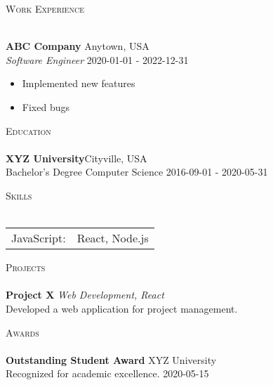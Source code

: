 \documentclass[a4paper]{article}
\newcommand{\lineunder} {
    \vspace*{-8pt} \\
    \hspace*{-18pt} \hrulefill \\
}
\newcommand{\header} [1] {
    {\hspace*{-18pt}\vspace*{6pt} \textsc{#1}}
    \vspace*{-6pt} \lineunder
}
\begin{document}
    \vspace*{-40pt}

    

      \header{Work Experience}
      \vspace{1mm}

      \textbf{ABC Company} \hfill Anytown, USA\\
          \textit{Software Engineer} \hfill 2020-01-01 - 2022-12-31\\
          \vspace{-1mm}
\begin{itemize} \itemsep 1pt
  \item Implemented new features
  \item Fixed bugs
\end{itemize}

      \header{Education}
      \textbf{XYZ University}\hfill Cityville, USA\\
Bachelor's Degree Computer Science \hfill 2016-09-01 - 2020-05-31\\
\vspace{2mm}

\header{Skills}
\begin{tabular}{ l l }
JavaScript: & React, Node.js \\
\end{tabular}
\vspace{2mm}

\header{Projects}
      {\textbf{Project X}} {\sl Web Development, React} \\
Developed a web application for project management.\\
\vspace*{2mm}

\header{Awards}
      \textbf{Outstanding Student Award} \hfill XYZ University\\
Recognized for academic excellence. \hfill 2020-05-15\\
\vspace*{2mm}





    \ 
    
\end{document}
